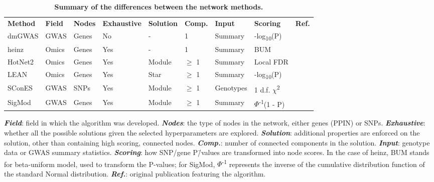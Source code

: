 \documentclass[10pt,letterpaper]{article}
\newlength\savedwidth
\newcommand\thickhline{\noalign{\global\savedwidth\arrayrulewidth\global\arrayrulewidth 2pt}%
\hline
\noalign{\global\arrayrulewidth\savedwidth}}
\begin{document}
\begin{table}[!ht]
  \begin{adjustwidth}{-2.25in}{0in} %
  \centering
  \caption{
  {\bf Summary of the differences between the network methods.}}
  \begin{tabular}{l|llllllll}
  {\bf Method} & {\bf Field } & {\bf Nodes} & {\bf Exhaustive} & {\bf Solution} & {\bf Comp.} & {\bf Input} & {\bf Scoring} & {\bf Ref.}\\ \thickhline
  dmGWAS & GWAS & Genes & No & - & 1 & Summary & -log\textsubscript{10}(P) & \cite{jia_dmgwas:_2011}\\
  heinz & Omics & Genes & Yes & - & 1 & Summary & BUM & \cite{dittrich_identifying_2008}\\
  HotNet2 & Omics & Genes & Yes & Module & \(\ge\) 1 & Summary & Local FDR & \cite{leiserson_pan-cancer_2015}\\
  LEAN & Omics & Genes & Yes & Star & \(\ge\) 1 & Summary & -log\textsubscript{10}(P) & \cite{gwinner_network-based_2016}\\
  SConES & GWAS & SNPs & Yes & Module & \(\ge\) 1 & Genotypes & 1 d.f. \(\chi\)\textsuperscript{2} & \cite{azencott_efficient_2013}\\
  SigMod & GWAS & Genes & Yes & Module & \(\ge\) 1 & Summary & $\Phi$\textsuperscript{-1}(1 - P) & \cite{liu_sigmod:_2017}\\
  \end{tabular}
  \begin{flushleft} \textbf{\emph{Field}}: field in which the algorithm was developed. \textbf{\emph{Nodes}}: the type of nodes in the network, either genes (PPIN) or SNPs. \textbf{\emph{Exhaustive}}: whether all the possible solutions given the selected hyperparameters are explored. \textbf{\emph{Solution}}: additional properties are enforced on the solution, other than containing high scoring, connected nodes. \textbf{\emph{Comp.}}: number of connected components in the solution. \textbf{\emph{Input}}: genotype data or GWAS summary statistics. \textbf{\emph{Scoring}}: how SNP/gene P\=/values are transformed into node scores. In the case of heinz, BUM stands for beta-uniform model, used to transform the P-values; for SigMod, $\Phi$\textsuperscript{-1} represents the inverse of the cumulative distribution function of the standard Normal distribution. \textbf{\emph{Ref.}}: original publication featuring the algorithm.
  \end{flushleft}
  \label{tab:method_comparison}
  \end{adjustwidth}
\end{table}
\end{document}
